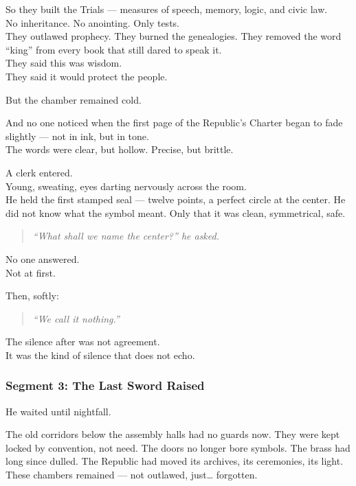 \documentclass[9pt]{article}
\begin{document}
So they built the Trials --- measures of speech, memory, logic, and civic law.\\
No inheritance. No anointing. Only tests.\\

They outlawed prophecy. 
They burned the genealogies.
They removed the word “king” from every book that still dared to speak it.\\

They said this was wisdom.\\
They said it would protect the people.

But the chamber remained cold.

And no one noticed when the first page of the Republic’s Charter began to fade slightly --- not in ink, but in tone.\\
The words were clear, but hollow. Precise, but brittle.

\vspace{1em}

A clerk entered.\\
Young, sweating, eyes darting nervously across the room.\\
He held the first stamped seal --- twelve points, a perfect circle at the center. He did not know what the symbol meant. Only that it was clean, symmetrical, safe.

\begin{quote}
\textit{“What shall we name the center?” he asked.}
\end{quote}

No one answered.\\
Not at first.

Then, softly:

\begin{quote}
\textit{“We call it nothing.”}
\end{quote}

The silence after was not agreement.\\
It was the kind of silence that does not echo.

\newpage

\subsubsection*{Segment 3: The Last Sword Raised}

He waited until nightfall.

The old corridors below the assembly halls had no guards now. They were kept locked by convention, not need. The doors no longer bore symbols. The brass had long since dulled. The Republic had moved its archives, its ceremonies, its light. These chambers remained --- not outlawed, just… forgotten.
\end{document}
